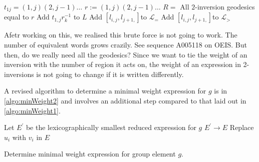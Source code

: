 \documentclass{article}
\newtheorem{definition}{Definition}
\begin{document}
\begin{algorithm}
 \SetAlgoLined
 {
    $t_{1j}=(1,j)(2,j-1) \hdots$ \;
    $r:=(1,j)(2,j-1) \hdots$ \;
     $R=$ { All $2$-inversion geodesics equal to $r$}   \;
     {
      Add $t_{1,j}r_{k}^{-1}$ to $L$ \;
     }
  }
  {
    {
      {
        Add $[l_{i,j},l_{j+1,}]$to $\mathcal{L}_{=}$ \;
      }
      {
        Add $[l_{i,j},l_{j+1,}]$to $\mathcal{L}_{>}$  \;     
      }
    }
  }
\end{algorithm}
Afetr working on this, we realised this brute force is not going to work. The number of equivalent words grows crazily. See sequence A005118 on OEIS. But then, do we really need all the geodesics? Since we want to tie the weight of an inversion with the number of region it acts on, the weight of an expression in 2-inversions is not going to change if it is written differently. 


A revised algorithm to determine a minimal weight expression for $g$ is in \ref{algo:minWeight2} and involves an additional step compared to that laid out in \ref{algo:minWeight1}. 
\begin{algorithm}
 \SetAlgoLined
 {
  Let $E^{\prime}$ be the lexicographically smallest reduced expression for $g$ \;
  $E^{\prime} \rightarrow E$
 }
 {
   Replace $u_i$ with $v_i$ in $E$\;
 }
 \caption{Determine minimal weight expression for group element $g$.}\label{algo:minWeight2}
\end{algorithm}
\end{document}

